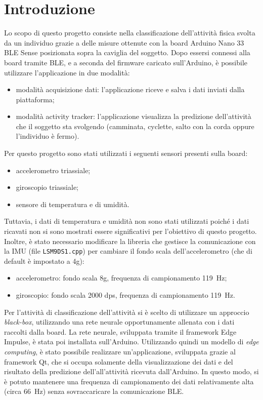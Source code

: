 \section{Introduzione}
Lo scopo di questo progetto consiste nella classificazione dell'attività fisica svolta da un individuo grazie a delle misure ottenute con la board Arduino Nano 33 BLE Sense posizionata sopra la caviglia del soggetto. Dopo essersi connessi alla board tramite BLE, e a seconda del firmware caricato sull'Arduino, è possibile utilizzare l'applicazione in due modalità:
\begin{itemize}
	\item modalità acquisizione dati: l'applicazione riceve e salva i dati inviati dalla piattaforma;
	\item modalità activity tracker: l'applicazione visualizza la predizione dell'attività che il soggetto sta svolgendo (camminata, cyclette, salto con la corda oppure l'individuo è fermo).
\end{itemize}
Per questo progetto sono stati utilizzati i seguenti sensori presenti sulla board:
\begin{itemize}
	\item accelerometro triassiale; 
	\item giroscopio triassiale;
	\item sensore di temperatura e di umidità.
\end{itemize}
Tuttavia, i dati di temperatura e umidità non sono stati utilizzati poiché i dati ricavati non si sono mostrati essere significativi per l'obiettivo di questo progetto. Inoltre, è stato necessario modificare la libreria che gestisce la comunicazione con la IMU (file \texttt{LSM9DS1.cpp}) per cambiare il fondo scala dell'accelerometro (che di default è impostato a 4g):
\begin{itemize}
	\item accelerometro: fondo scala 8g, frequenza di campionamento \SI{119}{\hertz};
	\item giroscopio: fondo scala 2000 dps, frequenza di campionamento \SI{119}{\hertz}.
\end{itemize}

Per l'attività di classificazione dell'attività si è scelto di utilizzare un approccio \textit{black-box}, utilizzando una rete neurale opportunamente allenata con i dati raccolti dalla board. La rete neurale, sviluppata tramite il framework Edge Impulse, è stata poi installata sull'Arduino. Utilizzando quindi un modello di \textit{edge computing}, è stato possibile realizzare un'applicazione, sviluppata grazie al framework Qt, che si occupa solamente della visualizzazione dei dati e del risultato della predizione dell'all'attività ricevuta dall'Arduino. In questo modo, si è potuto mantenere una frequenza di campionamento dei dati relativamente alta (circa \SI{66}{\hertz}) senza sovraccaricare la comunicazione BLE.


